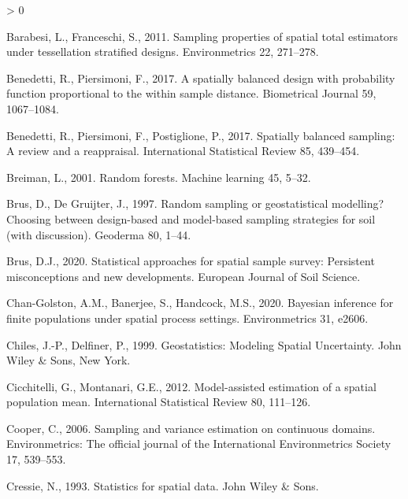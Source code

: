 \documentclass[]{elsarticle} %
\newlength{\cslhangindent}
\newenvironment{CSLReferences}[2] %
 {%
  \setlength{\parindent}{0pt}
  \ifodd #1 \everypar{\setlength{\hangindent}{\cslhangindent}}\ignorespaces\fi
  \ifnum #2 > 0
  \setlength{\parskip}{#2\baselineskip}
  \fi
 }%
 {}
\begin{document}
\hypertarget{refs}{}
\begin{CSLReferences}{1}{0}
\leavevmode\hypertarget{ref-barabesi2011sampling}{}%
Barabesi, L., Franceschi, S., 2011. Sampling properties of spatial total
estimators under tessellation stratified designs. Environmetrics 22,
271--278.

\leavevmode\hypertarget{ref-benedetti2017spatially}{}%
Benedetti, R., Piersimoni, F., 2017. A spatially balanced design with
probability function proportional to the within sample distance.
Biometrical Journal 59, 1067--1084.

\leavevmode\hypertarget{ref-benedetti2017spatiallyreview}{}%
Benedetti, R., Piersimoni, F., Postiglione, P., 2017. Spatially balanced
sampling: A review and a reappraisal. International Statistical Review
85, 439--454.

\leavevmode\hypertarget{ref-breiman2001random}{}%
Breiman, L., 2001. Random forests. Machine learning 45, 5--32.

\leavevmode\hypertarget{ref-brus1997random}{}%
Brus, D., De Gruijter, J., 1997. Random sampling or geostatistical
modelling? Choosing between design-based and model-based sampling
strategies for soil (with discussion). Geoderma 80, 1--44.

\leavevmode\hypertarget{ref-brus2020statistical}{}%
Brus, D.J., 2020. Statistical approaches for spatial sample survey:
Persistent misconceptions and new developments. European Journal of Soil
Science.

\leavevmode\hypertarget{ref-chan2020bayesian}{}%
Chan-Golston, A.M., Banerjee, S., Handcock, M.S., 2020. Bayesian
inference for finite populations under spatial process settings.
Environmetrics 31, e2606.

\leavevmode\hypertarget{ref-chiles1999geostatistics}{}%
Chiles, J.-P., Delfiner, P., 1999. Geostatistics: {Modeling Spatial
Uncertainty}. {John Wiley \& Sons}, New York.

\leavevmode\hypertarget{ref-cicchitelli2012model}{}%
Cicchitelli, G., Montanari, G.E., 2012. Model-assisted estimation of a
spatial population mean. International Statistical Review 80, 111--126.

\leavevmode\hypertarget{ref-cooper2006sampling}{}%
Cooper, C., 2006. Sampling and variance estimation on continuous
domains. Environmetrics: The official journal of the International
Environmetrics Society 17, 539--553.

\leavevmode\hypertarget{ref-cressie1993statistics}{}%
Cressie, N., 1993. Statistics for spatial data. John Wiley \& Sons.


\end{CSLReferences}
\end{document}
